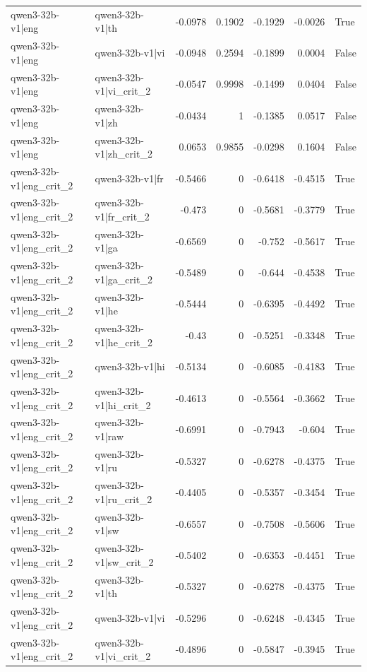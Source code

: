 \begin{table}
\begin{tabular}{l l r r r r l}
qwen3-32b-v1|eng & qwen3-32b-v1|th & -0.0978 & 0.1902 & -0.1929 & -0.0026 & True \\
qwen3-32b-v1|eng & qwen3-32b-v1|vi & -0.0948 & 0.2594 & -0.1899 & 0.0004 & False \\
qwen3-32b-v1|eng & qwen3-32b-v1|vi_crit_2 & -0.0547 & 0.9998 & -0.1499 & 0.0404 & False \\
qwen3-32b-v1|eng & qwen3-32b-v1|zh & -0.0434 & 1 & -0.1385 & 0.0517 & False \\
qwen3-32b-v1|eng & qwen3-32b-v1|zh_crit_2 & 0.0653 & 0.9855 & -0.0298 & 0.1604 & False \\
qwen3-32b-v1|eng_crit_2 & qwen3-32b-v1|fr & -0.5466 & 0 & -0.6418 & -0.4515 & True \\
qwen3-32b-v1|eng_crit_2 & qwen3-32b-v1|fr_crit_2 & -0.473 & 0 & -0.5681 & -0.3779 & True \\
qwen3-32b-v1|eng_crit_2 & qwen3-32b-v1|ga & -0.6569 & 0 & -0.752 & -0.5617 & True \\
qwen3-32b-v1|eng_crit_2 & qwen3-32b-v1|ga_crit_2 & -0.5489 & 0 & -0.644 & -0.4538 & True \\
qwen3-32b-v1|eng_crit_2 & qwen3-32b-v1|he & -0.5444 & 0 & -0.6395 & -0.4492 & True \\
qwen3-32b-v1|eng_crit_2 & qwen3-32b-v1|he_crit_2 & -0.43 & 0 & -0.5251 & -0.3348 & True \\
qwen3-32b-v1|eng_crit_2 & qwen3-32b-v1|hi & -0.5134 & 0 & -0.6085 & -0.4183 & True \\
qwen3-32b-v1|eng_crit_2 & qwen3-32b-v1|hi_crit_2 & -0.4613 & 0 & -0.5564 & -0.3662 & True \\
qwen3-32b-v1|eng_crit_2 & qwen3-32b-v1|raw & -0.6991 & 0 & -0.7943 & -0.604 & True \\
qwen3-32b-v1|eng_crit_2 & qwen3-32b-v1|ru & -0.5327 & 0 & -0.6278 & -0.4375 & True \\
qwen3-32b-v1|eng_crit_2 & qwen3-32b-v1|ru_crit_2 & -0.4405 & 0 & -0.5357 & -0.3454 & True \\
qwen3-32b-v1|eng_crit_2 & qwen3-32b-v1|sw & -0.6557 & 0 & -0.7508 & -0.5606 & True \\
qwen3-32b-v1|eng_crit_2 & qwen3-32b-v1|sw_crit_2 & -0.5402 & 0 & -0.6353 & -0.4451 & True \\
qwen3-32b-v1|eng_crit_2 & qwen3-32b-v1|th & -0.5327 & 0 & -0.6278 & -0.4375 & True \\
qwen3-32b-v1|eng_crit_2 & qwen3-32b-v1|vi & -0.5296 & 0 & -0.6248 & -0.4345 & True \\
qwen3-32b-v1|eng_crit_2 & qwen3-32b-v1|vi_crit_2 & -0.4896 & 0 & -0.5847 & -0.3945 & True \\

\end{tabular}
\end{table}
